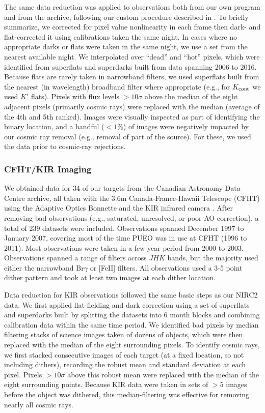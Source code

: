 \documentclass[twocolumn]{aastex62}
\begin{document}
The same data reduction was applied to observations both from our own program and from the archive, following our custom procedure described in \citet{Kraus2016a}. To briefly summarize, we corrected for pixel value nonlinearity in each frame then dark- and flat-corrected it using calibrations taken the same night. In cases where no appropriate darks or flats were taken in the same night, we use a set from the nearest available night. We interpolated over ``dead'' and ``hot'' pixels, which were identified from superflats and superdarks built from data spanning 2006 to 2016. Because flats are rarely taken in narrowband filters, we used superflats built from the nearest (in wavelength) broadband filter where appropriate (e.g., for $K_{\rm{cont}}$ we used $K'$ flats). Pixels with flux levels $>10\sigma$ above the median of the eight adjacent pixels (primarily cosmic rays) were replaced with the median (average of the 4th and 5th ranked). Images were visually inspected as part of identifying the binary location, and a handful ($<1\%$) of images were negatively impacted by our cosmic ray removal (e.g., removal of part of the source). For these, we used the data prior to cosmic-ray rejections.

\subsubsection{CFHT/KIR Imaging}

We obtained data for 34 of our targets from the Canadian Astronomy Data Centre archive, all taken with the 3.6m Canada-France-Hawaii Telescope (CFHT) using the Adaptive Optics Bonnette \citep[AOB, often referred to as PUEO after the Hawaiian owl,][]{1994SPIE.2201..833A} and the KIR infrared camera \citep{1998SPIE.3354..760D}. After removing bad observations (e.g., saturated, unresolved, or poor AO correction), a total of 239 datasets were included. Observations spanned December 1997 to January 2007, covering most of the time PUEO was in use at CFHT (1996 to 2011). Most observations were taken in a few-year period from 2000 to 2003. Observations spanned a range of filters across $JHK$ bands, but the majority used either the narrowband Br$\gamma$ or [FeII] filters. All observations used a 3-5 point dither pattern and took at least two images at each dither location. 

Data reduction for KIR observations followed the same basic steps as our NIRC2 data. We first applied flat-fielding and dark correction using a set of superflats and superdarks built by splitting the datasets into 6 month blocks and combining calibration data within the same time period. We identified bad pixels by median filtering stacks of science images taken of dozens of objects, which were then replaced with the median of the eight surrounding pixels. To identify cosmic rays, we first stacked consecutive images of each target (at a fixed location, so not including dithers), recording the robust mean and standard deviation at each pixel. Pixels $>10\sigma$ above this robust mean were replaced with the median of the eight surrounding points. Because KIR data were taken in sets of $>5$ images before the object was dithered, this median-filtering was effective for removing nearly all cosmic rays.
\end{document}
